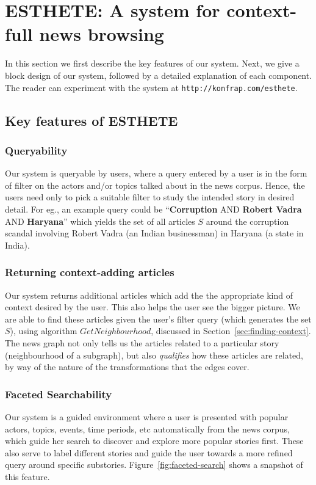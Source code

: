 \section{ESTHETE: A system for context-full news browsing }

In this section we first describe the key features of our system. Next, we give a block design of our system, followed by a detailed explanation
of each component. The reader can experiment with the system at {\tt http://konfrap.com/esthete}.

\subsection{Key features of ESTHETE}
\subsubsection{Queryability}
Our system is queryable by users, where a query entered by a user is in the form of filter on the actors and/or topics talked about in the
news corpus. Hence, the users need only to pick a suitable filter to study the intended story in desired detail. For eg., an example query could
be ``{\bf Corruption} AND {\bf Robert Vadra} AND {\bf Haryana}'' which yields the set of all articles $S$ around the corruption scandal involving Robert Vadra
(an Indian businessman) in Haryana (a state in India). 

\subsubsection{Returning context-adding articles}
Our system returns additional articles which add the the appropriate kind of context desired by the user. This also helps the user see the bigger picture. 
We are able to find these articles given the user's filter query (which generates the set $S$), using algorithm $GetNeighbourhood$, discussed in Section~\ref{sec:finding-context}. The news graph not only tells us the articles related to a particular story (neighbourhood of a subgraph), but also \emph{qualifies} how these articles are related, by way of the nature of the transformations that the edges cover. 

\subsubsection{Faceted Searchability}
Our system is a guided environment where a user is presented with popular actors, topics, events, time periods, etc automatically from the 
news corpus, which guide her search to discover and explore more popular stories first. These also serve to label different stories and guide the
user towards a more refined query around specific substories. Figure~\ref{fig:faceted-search} shows a snapshot of this feature.


